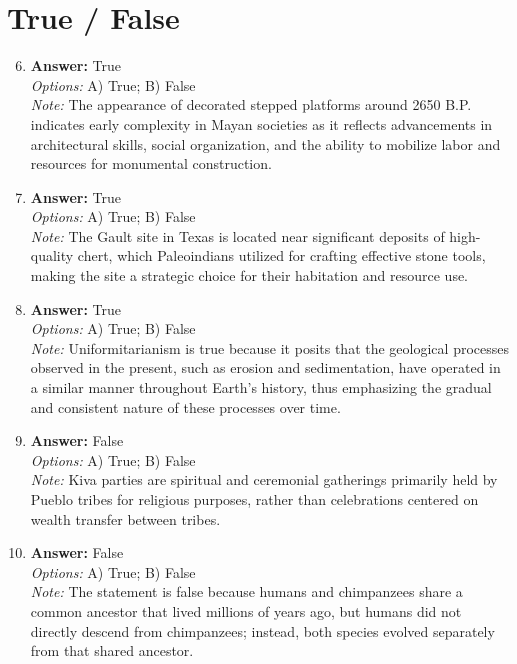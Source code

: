 \documentclass[12pt]{article}
\begin{document}
\section*{True / False}
\begin{enumerate}[label=\arabic*.]
\setcounter{enumi}{5}
\item \textbf{Answer:} True
\\ \textit{Options:} A) True; B) False
\\ \textit{Note:} The appearance of decorated stepped platforms around 2650 B.P. indicates early complexity in Mayan societies as it reflects advancements in architectural skills, social organization, and the ability to mobilize labor and resources for monumental construction.
\item \textbf{Answer:} True
\\ \textit{Options:} A) True; B) False
\\ \textit{Note:} The Gault site in Texas is located near significant deposits of high-quality chert, which Paleoindians utilized for crafting effective stone tools, making the site a strategic choice for their habitation and resource use.
\item \textbf{Answer:} True
\\ \textit{Options:} A) True; B) False
\\ \textit{Note:} Uniformitarianism is true because it posits that the geological processes observed in the present, such as erosion and sedimentation, have operated in a similar manner throughout Earth's history, thus emphasizing the gradual and consistent nature of these processes over time.
\item \textbf{Answer:} False
\\ \textit{Options:} A) True; B) False
\\ \textit{Note:} Kiva parties are spiritual and ceremonial gatherings primarily held by Pueblo tribes for religious purposes, rather than celebrations centered on wealth transfer between tribes.
\item \textbf{Answer:} False
\\ \textit{Options:} A) True; B) False
\\ \textit{Note:} The statement is false because humans and chimpanzees share a common ancestor that lived millions of years ago, but humans did not directly descend from chimpanzees; instead, both species evolved separately from that shared ancestor.
\end{enumerate}
\end{document}

